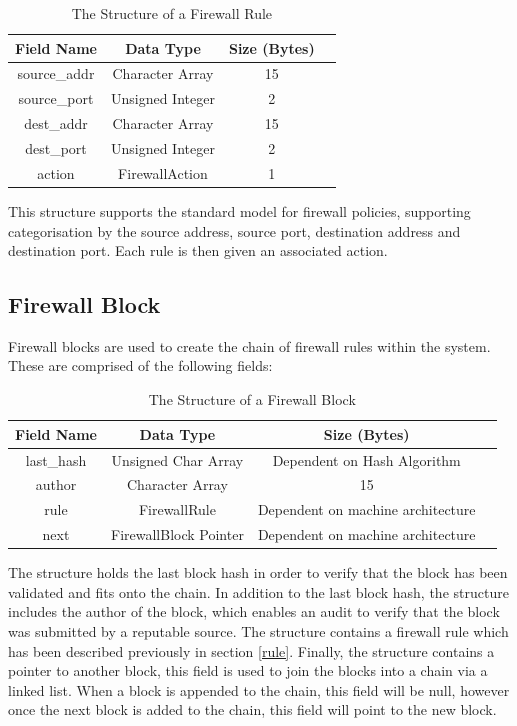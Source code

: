 \documentclass[a4paper, 11pt]{report}
\begin{document}
\begin{table}[H]
\centering
\begin{tabular}{ |c|c|c|c| } 
\hline
Field Name & Data Type & Size (Bytes) \\
\hline
source_addr & Character Array & 15 \\
source_port & Unsigned Integer & 2 \\
dest_addr & Character Array & 15 \\
dest_port & Unsigned Integer & 2 \\
action & FirewallAction & 1 \\
\hline
\end{tabular}
\caption{The Structure of a Firewall Rule}
\label{tab:rulestr}
\end{table}

This structure supports the standard model for firewall policies, supporting categorisation by the source address, source port, destination address and destination port. Each rule is then given an associated action.

\subsection{Firewall Block} \label{firewallblock}
Firewall blocks are used to create the chain of firewall rules within the system. These are comprised of the following fields:

\begin{table}[H]
\centering
\begin{tabular}{ |c|c|c|c| } 
\hline
Field Name & Data Type & Size (Bytes) \\
\hline
last_hash & Unsigned Char Array & Dependent on Hash Algorithm \\ 
author & Character Array & 15 \\
rule & FirewallRule & Dependent on machine architecture \\
next & FirewallBlock Pointer & Dependent on machine architecture \\
\hline
\end{tabular}
\caption{The Structure of a Firewall Block}
\label{tab:firewallblock}
\end{table}

The structure holds the last block hash in order to verify that the block has been validated and fits onto the chain. In addition to the last block hash, the structure includes the author of the block, which enables an audit to verify that the block was submitted by a reputable source. The structure contains a firewall rule which has been described previously in section \ref{rule}. Finally, the structure contains a pointer to another block, this field is used to join the blocks into a chain via a linked list. When a block is appended to the chain, this field will be null, however once the next block is added to the chain, this field will point to the new block.
\end{document}
